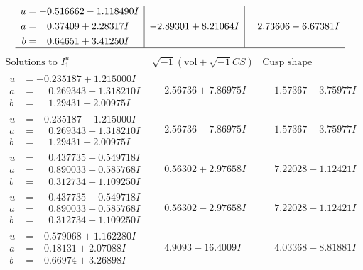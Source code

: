 \documentclass[1p]{elsarticle_modified}
\theoremstyle{definition}
\newcommand{\I}{\sqrt{-1}}
\begin{document}
$$\begin{array}{c|c|c}
\begin{aligned}
u &= -0.516662 - 1.118490 I \\
a &= \phantom{-}0.37409 + 2.28317 I \\
b &= \phantom{-}0.64651 + 3.41250 I\end{aligned}
 & -2.89301 + 8.21064 I & \phantom{-}2.73606 - 6.67381 I\\
 \hline 
 \end{array}$$\newpage$$\begin{array}{c|c|c}  
\text{Solutions to }I^u_{1}& \I (\text{vol} + \sqrt{-1}CS) & \text{Cusp shape}\\
 \hline 
\begin{aligned}
u &= -0.235187 + 1.215000 I \\
a &= \phantom{-}0.269343 + 1.318210 I \\
b &= \phantom{-}1.29431 + 2.00975 I\end{aligned}
 & \phantom{-}2.56736 + 7.86975 I & \phantom{-}1.57367 - 3.75977 I \\ \hline\begin{aligned}
u &= -0.235187 - 1.215000 I \\
a &= \phantom{-}0.269343 - 1.318210 I \\
b &= \phantom{-}1.29431 - 2.00975 I\end{aligned}
 & \phantom{-}2.56736 - 7.86975 I & \phantom{-}1.57367 + 3.75977 I \\ \hline\begin{aligned}
u &= \phantom{-}0.437735 + 0.549718 I \\
a &= \phantom{-}0.890033 + 0.585768 I \\
b &= \phantom{-}0.312734 - 1.109250 I\end{aligned}
 & \phantom{-}0.56302 + 2.97658 I & \phantom{-}7.22028 + 1.12421 I \\ \hline\begin{aligned}
u &= \phantom{-}0.437735 - 0.549718 I \\
a &= \phantom{-}0.890033 - 0.585768 I \\
b &= \phantom{-}0.312734 + 1.109250 I\end{aligned}
 & \phantom{-}0.56302 - 2.97658 I & \phantom{-}7.22028 - 1.12421 I \\ \hline\begin{aligned}
u &= -0.579068 + 1.162280 I \\
a &= -0.18131 + 2.07088 I \\
b &= -0.66974 + 3.26898 I\end{aligned}
 & \phantom{-}4.9093 - 16.4009 I & \phantom{-}4.03368 + 8.81881 I \\ \hline\begin{aligned}

\end{aligned}
\end{array}$$
\end{document}
